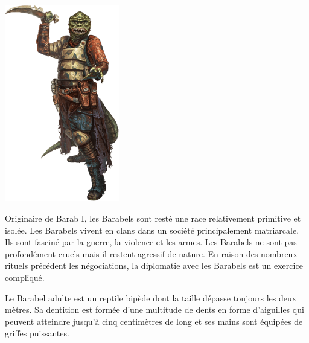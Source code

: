 \vspace{-5\baselineskip}
\includegraphics[width=5cm]{img/races/barabel.png}

Originaire de Barab I, les Barabels sont resté une race relativement primitive et isolée. Les Barabels vivent en clans dans un société principalement matriarcale. Ils sont fasciné par la guerre, la violence et les armes. Les Barabels ne sont pas profondément cruels mais il restent agressif de nature. En raison des nombreux rituels précédent les négociations, la diplomatie avec les Barabels est un exercice compliqué.

Le Barabel adulte est un reptile bipède dont la taille dépasse toujours les deux mètres. Sa dentition est formée d'une multitude de dents en forme d'aiguilles qui peuvent atteindre jusqu'à cinq centimètres de long et ses mains sont équipées de griffes puissantes.

